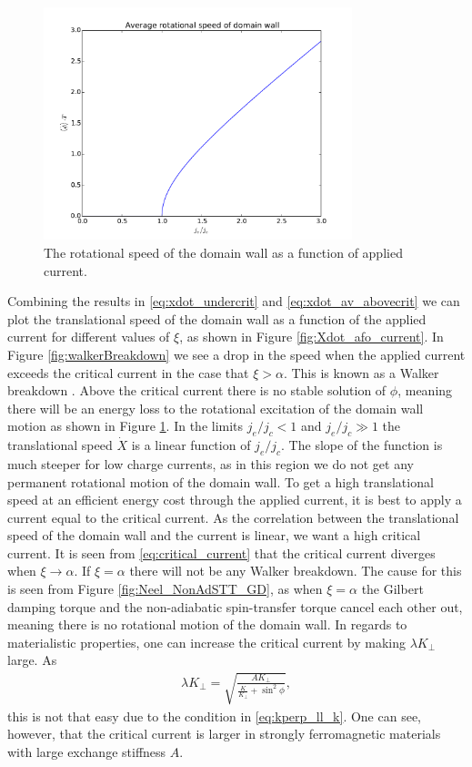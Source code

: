 \documentclass[12pt, a4paper, twoside, openright]{article}		%
\numberwithin{equation}{section}
\begin{document}
\begin{figure}[h!]
\begin{center}
\includegraphics[width=0.8\textwidth]{Figures/criticalCurrentPhidot.pdf} 
\caption{The rotational speed of the domain wall as a function of applied current.}
\label{fig:phidot_afo_current} 
\end{center}
\end{figure}
Combining the results in \eqref{eq:xdot_undercrit} and \eqref{eq:xdot_av_abovecrit} we can plot the translational speed of the domain wall as a function of the applied current for different values of $\xi$, as shown in Figure \ref{fig:Xdot_afo_current}. In Figure \ref{fig:walkerBreakdown} we see a drop in the speed when the applied current exceeds the critical current in the case that $\xi > \alpha$. This is known as a Walker breakdown \cite{SchryerWalker1974}. Above the critical current there is no stable solution of $\phi$, meaning there will be an energy loss to the rotational excitation of the domain wall motion as shown in Figure \ref{fig:phidot_afo_current}. In the limits $j_e/j_c < 1$ and $j_e/j_c \gg 1$ the translational speed $\dot{X}$ is a linear function of $j_e/j_c$. The slope of the function is much steeper for low charge currents, as in this region we do not get any permanent rotational motion of the domain wall. To get a high translational speed at an efficient energy cost through the applied current, it is best to apply a current equal to the critical current. As the correlation between the translational speed of the domain wall and the current is linear, we want a high critical current. It is seen from \eqref{eq:critical_current} that the critical current diverges when $\xi \rightarrow \alpha$. If $\xi=\alpha$ there will not be any Walker breakdown. The cause for this is seen from Figure \ref{fig:Neel_NonAdSTT_GD}, as when $\xi=\alpha$ the Gilbert damping torque and the non-adiabatic spin-transfer torque cancel each other out, meaning there is no rotational motion of the domain wall. In regards to materialistic properties, one can increase the critical current by making $\lambda K_{\perp}$ large. As 
\begin{align}
\lambda K_{\perp} = \sqrt{\frac{AK_{\perp}}{\frac{K}{K_{\perp}}+\sin^2\phi}},
\end{align}
this is not that easy due to the condition in \eqref{eq:kperp_ll_k}. One can see, however, that the critical current is larger in strongly ferromagnetic materials with large exchange stiffness $A$.
\end{document}
